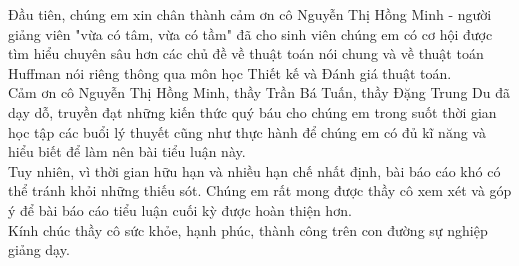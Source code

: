 \begin{acknowledgments}
	Đầu tiên, chúng em xin chân thành cảm ơn cô Nguyễn Thị Hồng Minh - người giảng viên "vừa có tâm, vừa có tầm" đã cho sinh viên chúng em có cơ hội được tìm hiểu chuyên sâu hơn các chủ đề về thuật toán nói chung và về thuật toán Huffman nói riêng thông qua môn học Thiết kế và Đánh giá thuật toán.\\
	\indent{}  Cảm ơn cô Nguyễn Thị Hồng Minh, thầy Trần Bá Tuấn, thầy Đặng Trung Du đã dạy dỗ, truyền đạt những kiến thức quý báu cho chúng em trong suốt thời gian học tập các buổi lý thuyết cũng như thực hành để chúng em có đủ kĩ năng và hiểu biết để làm nên bài tiểu luận này.\\
	\indent{} Tuy nhiên, vì thời gian hữu hạn và nhiều hạn chế nhất định, bài báo cáo khó có thể tránh khỏi những thiếu sót. Chúng em rất mong được thầy cô xem xét và góp ý để bài báo cáo tiểu luận cuối kỳ được hoàn thiện hơn.\\
	\indent{}Kính chúc thầy cô sức khỏe, hạnh phúc, thành công trên con đường sự nghiệp giảng dạy.
\end{acknowledgments}